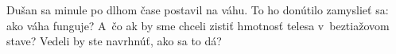 Dušan sa minule po dlhom čase postavil na váhu. To ho donútilo zamyslieť sa: ako váha funguje?
A~čo ak by sme chceli zistiť hmotnosť telesa v~beztiažovom stave? Vedeli by ste navrhnúť, ako sa to dá?